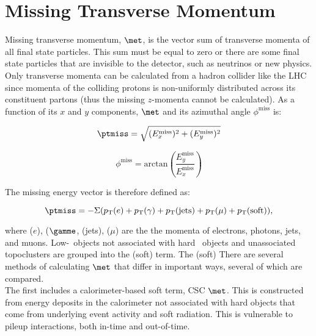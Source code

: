 \section{Missing Transverse Momentum} \label{sec:met}

Missing transverse momentum, $\met$, is the vector sum of transverse momenta of all final state particles.  This sum must be equal to zero or there are some final state particles that are invisible to the detector, such as neutrinos or new physics.  Only transverse momenta can be calculated from a hadron collider like the LHC since momenta of the colliding protons is non-uniformly distributed across its constituent partons (thus the missing $z$-momenta cannot be calculated).  As a function of its $x$ and $y$ components, $\met$ and its azimuthal angle $\phi^{\mathrm{miss}}$ is:

\begin{equation}
\ptmiss = \sqrt{(E_{x}^{\mathrm{miss}})^2 + (E_{y}^{\mathrm{miss}})^2}
\end{equation}

\begin{equation}
\phi^{\mathrm{miss}} = \mathrm{arctan}(\frac{E_{y}^{\mathrm{miss}}}{E_{x}^{\mathrm{miss}}})
\end{equation}


The missing energy vector is therefore defined as:

\begin{equation}
\ptmiss = -\Sigma(\pt(e) + \pt(\gamma) + \pt({\rm jets}) + \pt(\mu) + \pt({\rm soft})),
\label{eq:met}
\end{equation}


where \pt($e$), \pt($\gamme$, \pt(jets), \pt($\mu$) are the the momenta of electrons, photons, jets, and muons.   Low-\pt\ objects not associated with hard \pt\ objects and unassociated topoclusters are grouped into the \pt(soft) term.  The \pt(soft)  There are several methods of calculating $\met$ that differ in important ways, several of which are compared\cite{metrun2}. \\

The first  includes a calorimeter-based soft term, CSC $\met$.  This is constructed from energy deposits in the calorimeter not associated with hard objects that come from underlying event activity and soft radiation.  This is vulnerable to pileup interactions, both in-time and out-of-time. \\


